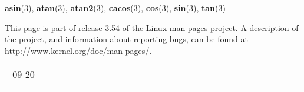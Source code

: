 \documentclass[]{article}
\let\realtextbf=\textbf
\renewcommand{\textbf}[1]{\textcolor{boldcolor}{\realtextbf{#1}}}
\renewcommand{\emph}[1]{\underline{#1}}
\begin{document}
\textbf{asin}(3), \textbf{atan}(3), \textbf{atan2}(3),
\textbf{cacos}(3), \textbf{cos}(3), \textbf{sin}(3), \textbf{tan}(3)


This page is part of release 3.54 of the Linux \emph{man-pages} project.
A description of the project, and information about reporting bugs, can
be found at http://www.kernel.org/doc/man-pages/.

\begin{longtable}[c]{@{}ll@{}}
\toprule\addlinespace
2010-09-20 &
\\\addlinespace
\bottomrule
\end{longtable}
\end{document}
